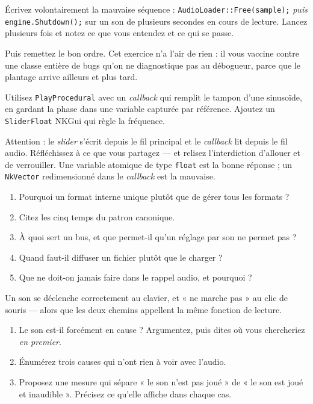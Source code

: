 \begin{nkdemo}
Écrivez volontairement la mauvaise séquence :
\texttt{AudioLoader::Free(sample);} \emph{puis} \texttt{engine.Shutdown();} sur
un son de plusieurs secondes en cours de lecture. Lancez plusieurs fois et notez
ce que vous entendez et ce qui se passe.

Puis remettez le bon ordre. Cet exercice n'a l'air de rien : il vous vaccine
contre une classe entière de bugs qu'on ne diagnostique pas au débogueur, parce
que le plantage arrive ailleurs et plus tard.
\end{nkdemo}

\begin{nkpratique}
Utilisez \texttt{PlayProcedural} avec un \emph{callback} qui remplit le tampon
d'une sinusoïde, en gardant la phase dans une variable capturée par référence.
Ajoutez un \texttt{SliderFloat} NKGui qui règle la fréquence.

Attention : le \emph{slider} s'écrit depuis le fil principal et le
\emph{callback} lit depuis le fil audio. Réfléchissez à ce que vous partagez —
et relisez l'interdiction d'allouer et de verrouiller. Une variable atomique de
type \texttt{float} est la bonne réponse ; un \texttt{NkVector} redimensionné
dans le \emph{callback} est la mauvaise.
\end{nkpratique}

\begin{nkquestions}
\begin{enumerate}
\item Pourquoi un format interne unique plutôt que de gérer tous les formats ?
\item Citez les cinq temps du patron canonique.
\item À quoi sert un bus, et que permet-il qu'un réglage par son ne permet pas ?
\item Quand faut-il diffuser un fichier plutôt que le charger ?
\item Que ne doit-on jamais faire dans le rappel audio, et pourquoi ?
\end{enumerate}
\end{nkquestions}

\begin{nklogique}
Un son se déclenche correctement au clavier, et « ne marche pas » au clic de
souris --- alors que les deux chemins appellent la même fonction de lecture.

\begin{enumerate}
\item Le son est-il forcément en cause ? Argumentez, puis dites où vous
      chercheriez \emph{en premier}.
\item Énumérez trois causes qui n'ont rien à voir avec l'audio.
\item Proposez une mesure qui sépare « le son n'est pas joué » de « le son est
      joué et inaudible ». Précisez ce qu'elle affiche dans chaque cas.
\end{enumerate}
\end{nklogique}
